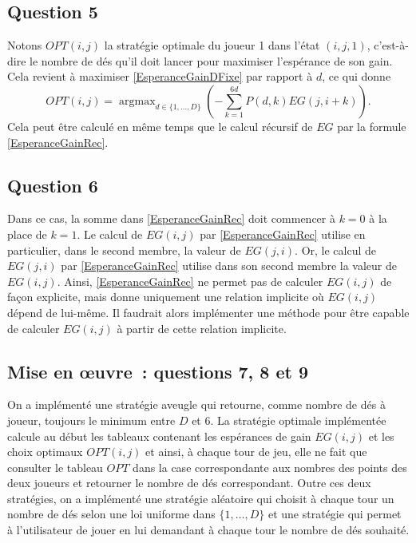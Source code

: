 \documentclass[a4paper,11pt]{amsart}
\theoremstyle{plain}
\DeclareMathOperator*{\argmax}{argmax}
\begin{document}
\subsection{Question 5}

Notons $OPT(i, j)$ la stratégie optimale du joueur 1 dans l'état $(i, j, 1)$, c'est-à-dire le nombre de dés qu'il doit lancer pour maximiser l'espérance de son gain. Cela revient à maximiser \eqref{EsperanceGainDFixe} par rapport à $d$, ce qui donne
\[
OPT(i, j) = \argmax_{d \in \{1, \dotsc, D\}} \left(-\sum_{k=1}^{6d} P(d, k) EG(j, i+k)\right).
\]
Cela peut être calculé en même temps que le calcul récursif de $EG$ par la formule \eqref{EsperanceGainRec}.

\subsection{Question 6}

Dans ce cas, la somme dans \eqref{EsperanceGainRec} doit commencer à $k = 0$ à la place de $k = 1$. Le calcul de $EG(i, j)$ par \eqref{EsperanceGainRec} utilise en particulier, dans le second membre, la valeur de $EG(j, i)$. Or, le calcul de $EG(j, i)$ par \eqref{EsperanceGainRec} utilise dans son second membre la valeur de $EG(i, j)$. Ainsi, \eqref{EsperanceGainRec} ne permet pas de calculer $EG(i, j)$ de façon explicite, mais donne uniquement une relation implicite où $EG(i, j)$ dépend de lui-même. Il faudrait alors implémenter une méthode pour être capable de calculer $EG(i, j)$ à partir de cette relation implicite.

\subsection{Mise en \oe{}uvre~: questions 7, 8 et 9}

On a implémenté une stratégie aveugle qui retourne, comme nombre de dés à joueur, toujours le minimum entre $D$ et $6$. La stratégie optimale implémentée calcule au début les tableaux contenant les espérances de gain $EG(i, j)$ et les choix optimaux $OPT(i, j)$ et ainsi, à chaque tour de jeu, elle ne fait que consulter le tableau $OPT$ dans la case correspondante aux nombres des points des deux joueurs et retourner le nombre de dés correspondant. Outre ces deux stratégies, on a implémenté une stratégie aléatoire qui choisit à chaque tour un nombre de dés selon une loi uniforme dans $\{1, \dotsc, D\}$ et une stratégie qui permet à l'utilisateur de jouer en lui demandant à chaque tour le nombre de dés souhaité.
\end{document}

